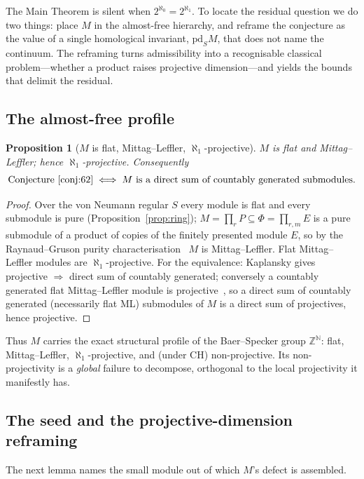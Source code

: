 \documentclass[11pt,reqno]{amsart}
\theoremstyle{plain}
\newtheorem{proposition}[theorem]{Proposition}
\theoremstyle{definition}
\theoremstyle{remark}
\newcommand{\pd}{\mathrm{pd}}
\newcommand{\N}{\mathbb{N}}
\newcommand{\Z}{\mathbb{Z}}
\begin{document}
The Main Theorem is silent when $2^{\aleph_0}=2^{\aleph_1}$. To locate the residual question we do two things: place $M$ in the almost-free hierarchy, and reframe the conjecture as the value of a single homological invariant, $\pd_S M$, that does not name the continuum. The reframing turns admissibility into a recognisable classical problem---whether a product raises projective dimension---and yields the bounds that delimit the residual.

\subsection{The almost-free profile}

\begin{proposition}[$M$ is flat, Mittag--Leffler, $\aleph_1$-projective]\label{prop:ml}
$M$ is flat and Mittag--Leffler; hence $\aleph_1$-projective. Consequently
\[
  \text{Conjecture~\ref{conj:62}}\iff M\text{ is a direct sum of countably generated submodules.}
\]
\end{proposition}

\begin{proof}
Over the von Neumann regular $S$ every module is flat and every submodule is pure (Proposition~\ref{prop:ring}); $M=\prod_r P\subseteq\Phi=\prod_{r,m}E$ is a pure submodule of a product of copies of the finitely presented module $E$, so by the Raynaud--Gruson purity characterisation~\cite{raynaud-gruson} $M$ is Mittag--Leffler. Flat Mittag--Leffler modules are $\aleph_1$-projective. For the equivalence: Kaplansky gives projective $\Rightarrow$ direct sum of countably generated; conversely a countably generated flat Mittag--Leffler module is projective~\cite{raynaud-gruson,zimmermann-huisgen}, so a direct sum of countably generated (necessarily flat ML) submodules of $M$ is a direct sum of projectives, hence projective.
\end{proof}

Thus $M$ carries the exact structural profile of the Baer--Specker group $\Z^{\N}$: flat, Mittag--Leffler, $\aleph_1$-projective, and (under CH) non-projective. Its non-projectivity is a \emph{global} failure to decompose, orthogonal to the local projectivity it manifestly has.

\subsection{The seed and the projective-dimension reframing}

The next lemma names the small module out of which $M$'s defect is assembled.
\end{document}
